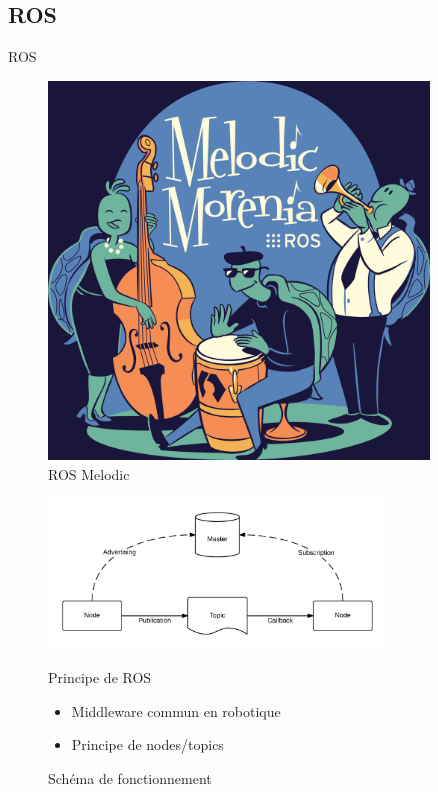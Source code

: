 \documentclass[pdftex,beamer,aspectratio=169]{beamer}
\theoremstyle{definition}
\theoremstyle{example}
\theoremstyle{plain}
\begin{document}
\subsection{ROS}
\begin{frame}[fragile]{ROS}
  \centering
  \begin{minipage}{0.3\textwidth}
    \begin{figure}
      \centering
      \includegraphics[width=0.9\textwidth]{melodic.png}
      \caption{ROS Melodic}
    \end{figure}
  \end{minipage}\hfill
  \begin{minipage}{0.65\textwidth}
    \begin{figure}
      \centering
      \includegraphics[width=0.8\textwidth]{ROS-master-node-topic.png}
      \caption{Schéma de fonctionnement}

    \begin{exampleblock}{Principe de ROS}
      \begin{itemize}
        \item Middleware commun en robotique
        \item Principe de nodes/topics
      \end{itemize}
    \end{exampleblock}
    \end{figure}
  \end{minipage}
\end{frame}
\end{document}
